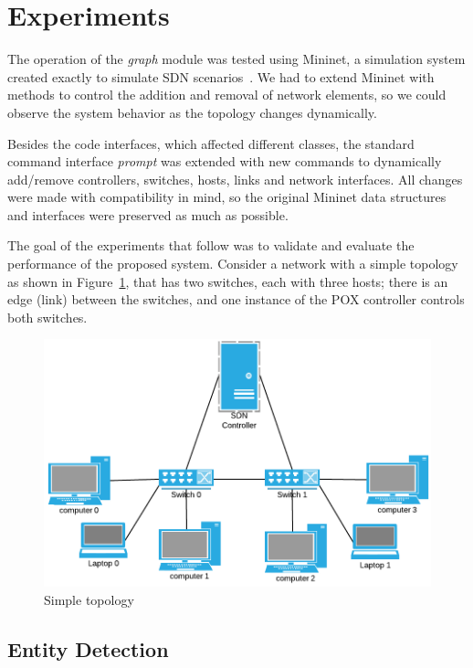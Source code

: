 \section{Experiments}
\label{sec:experiments}

The operation of the \emph{graph} module was tested using
Mininet, a simulation system created exactly to simulate SDN
scenarios~\cite{lantz2010network}. We had to extend Mininet with
methods to control the addition and removal of network elements,
so we could observe the system behavior as the topology changes
dynamically.

Besides the code interfaces, which affected different classes,
the standard command interface \emph{prompt} was extended with new commands
to dynamically add/remove controllers, switches, hosts, links and network
interfaces. All changes were made with compatibility in mind, so the
original Mininet data structures and interfaces were preserved as much as
possible.

The goal of the experiments that follow was to validate and evaluate the
performance of the proposed system.
Consider a network with a simple topology as shown in
Figure~\ref{fig:topology}, that has two switches,
each with three hosts;
there is an edge (link) between the switches, and
one instance of the POX controller controls both switches.

\begin{figure}[!h]
    \centering
    \includegraphics[width=1.0\columnwidth]{img/simple_topology.png}
    \caption{Simple topology}
    \label{fig:topology}
\end{figure}


\subsection{Entity Detection}


